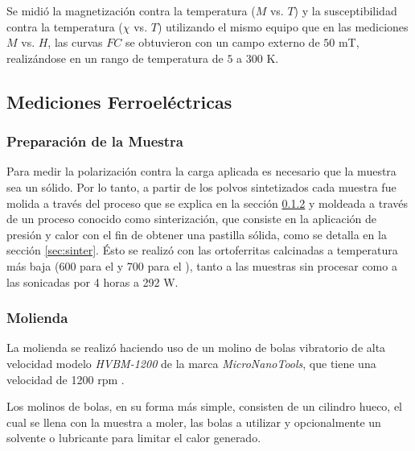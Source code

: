 \documentclass[../main.tex]{subfiles}
\begin{document}
Se midió la magnetización contra la temperatura ($M$ vs. $T$) y la susceptibilidad contra la temperatura ($\chi$ vs. $T$) utilizando el mismo equipo que en las mediciones $M$ vs. $H$, las curvas $FC$ se obtuvieron con un campo externo de $50$ mT, realizándose en un rango de temperatura de $5$ a $300$ K.
\subsection{Mediciones Ferroeléctricas}

\subsubsection{Preparación de la Muestra}
Para medir la polarización contra la carga aplicada es necesario que la muestra sea un sólido. Por lo tanto, a partir de los polvos sintetizados cada muestra fue molida a través del proceso que se explica en la sección \ref{sec:molienda} y moldeada a través de un proceso conocido como sinterización, que consiste en la aplicación de presión y calor con el fin de obtener una pastilla sólida, como se detalla en la sección \ref{sec:sinter}. Ésto se realizó con las ortoferritas calcinadas a temperatura más baja (600\gradoC{} para el \neod{} y 700\gradoC{} para el \sama{}), tanto a las muestras sin procesar como a las sonicadas por 4 horas a 292 W.

\subsubsection{Molienda} \label{sec:molienda}
La molienda se realizó haciendo uso de un molino de bolas vibratorio de alta velocidad modelo \textit{HVBM-1200} de la marca \textit{MicroNanoTools}, que tiene una velocidad de 1200 rpm \cite{Molino}.

Los molinos de bolas, en su forma más simple, consisten de un cilindro hueco, el cual se llena con la muestra a moler, las bolas a utilizar y opcionalmente un solvente o lubricante para limitar el calor generado.
\end{document}
